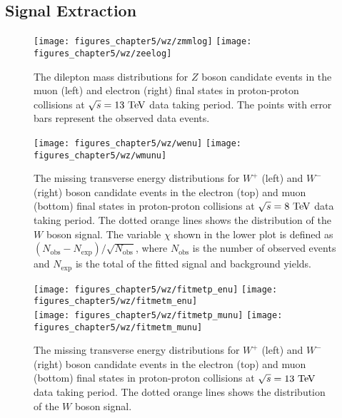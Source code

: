 \subsection{Signal Extraction}




\begin{figure}[h]
\centering
\texttt{[image: figures\_chapter5/wz/zmmlog]}
\texttt{[image: figures\_chapter5/wz/zeelog]}
\caption{The dilepton mass distributions for $Z$ boson candidate events in the muon (left) and electron (right) final states in proton-proton collisions at $\sqrt{s}=13~\mathrm{Te\kern -0.1em V}$ data taking period. The points with error bars represent the observed data events.
\label{fig:z13}}
\end{figure}

\begin{figure}[h]
\centering
        \texttt{[image: figures\_chapter5/wz/wenu]}
        \texttt{[image: figures\_chapter5/wz/wmunu]}
       \caption{The missing transverse energy distributions for
         $W^+$  (left) and $W^-$  (right) boson candidate events in the electron (top)
       and muon (bottom) final states in proton-proton collisions at $\sqrt{s}=8~\mathrm{Te\kern -0.1em V}$ data taking period. The dotted orange lines shows the distribution of the $W$ boson signal. The variable $\chi$ shown in the lower plot is defined as $(N_{\text{obs}}-N_{\text{exp}})/\sqrt{N_{\text{obs}}}$, where $N_{\text{obs}}$ is the number of observed events and $N_{\text{exp}}$ is the total of the fitted signal and background yields.
       \label{fig:W8}}
\end{figure}


\begin{figure}[h]
\centering
        \texttt{[image: figures\_chapter5/wz/fitmetp\_enu]}
        \texttt{[image: figures\_chapter5/wz/fitmetm\_enu]}\\
        \texttt{[image: figures\_chapter5/wz/fitmetp\_munu]}
        \texttt{[image: figures\_chapter5/wz/fitmetm\_munu]}
       \caption{The missing transverse energy distributions for
         $W^+$  (left) and $W^-$  (right) boson candidate events in the electron (top)
       and muon (bottom) final states in proton-proton collisions at $\sqrt{s}=13~\mathrm{Te\kern -0.1em V}$ data taking period. The dotted orange lines shows the distribution of the $W$ boson signal. 
       \label{fig:W13}}
\end{figure}

